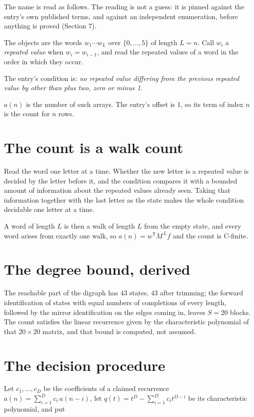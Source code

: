 \documentclass[11pt]{article}
\theoremstyle{definition}
\begin{document}
The name is read as follows. The reading is not a guess: it is pinned against the entry's own published terms, and against an independent enumeration, before anything is proved (Section 7).

The objects are the words $w_1\cdots w_L$ over $\{0,\dots,5\}$ of length $L = n$. Call $w_i$ a {\itshape repeated value} when $w_i = w_{i-1}$, and read the repeated values of a word in the order in which they occur.

The entry's condition is: {\itshape no repeated value differing from the previous repeated value by other than plus two, zero or minus 1}.

$a(n)$ is the number of such arrays. The entry's offset is 1, so its term of index $n$ is the count for $n$ rows.

\section{The count is a walk count}

Read the word one letter at a time. Whether the new letter is a repeated value is decided by the letter before it, and the condition compares it with a bounded amount of information about the repeated values already seen. Taking that information together with the last letter as the state makes the whole condition decidable one letter at a time.

A word of length $L$ is then a walk of length $L$ from the empty state, and every word arises from exactly one walk, so $a(n) = w^{\mathsf T}M^{\,L}f$ and the count is C-finite.

\section{The degree bound, derived}

The reachable part of the digraph has $43$ states, $43$ after trimming; the forward identification of states with equal numbers of completions of every length, followed by the mirror identification on the edges coming in, leaves $S = 20$ blocks. The count satisfies the linear recurrence given by the characteristic polynomial of that $20\times20$ matrix, and that bound is computed, not assumed.

\section{The decision procedure}

Let $c_1,\dots,c_D$ be the coefficients of a claimed recurrence $a(n) = \sum_{i=1}^{D} c_i\,a(n-i)$, let $q(t) = t^{D} - \sum_{i=1}^{D} c_i t^{D-i}$ be its characteristic polynomial, and put
\end{document}
